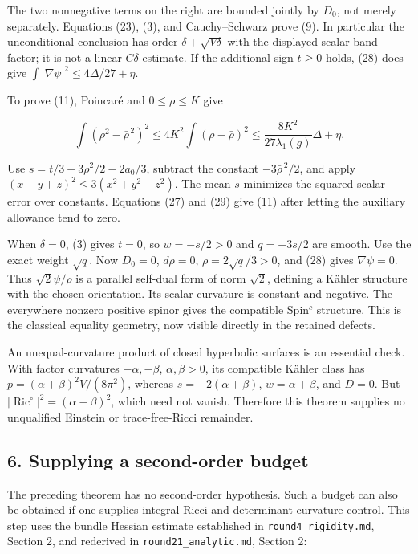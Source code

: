 \documentclass[
  11pt,
]{article}
\begin{document}
The two nonnegative terms on the right are bounded jointly by \(D_0\),
not merely separately. Equations (23), (3), and Cauchy--Schwarz prove
(9). In particular the unconditional conclusion has order
\(\delta+\sqrt{V\delta}\) with the displayed scalar-band factor; it is
not a linear \(C\delta\) estimate. If the additional sign \(t\ge0\)
holds, (28) does give \(\int|\nabla\psi|^2\le4\Delta/27+\eta\).

To prove (11), Poincaré and \(0\le\rho\le K\) give

\[
 \int(\rho^2-\bar\rho^{\,2})^2
 \le4K^2\int(\rho-\bar\rho)^2
 \le\frac{8K^2}{27\lambda_1(g)}\Delta+\eta.
 \tag{29}
\]

Use \(s=t/3-3\rho^2/2-2a_0/3\), subtract the constant
\(-3\bar\rho^{\,2}/2\), and apply \((x+y+z)^2\le3(x^2+y^2+z^2)\). The
mean \(\bar s\) minimizes the squared scalar error over constants.
Equations (27) and (29) give (11) after letting the auxiliary allowance
tend to zero.

When \(\delta=0\), (3) gives \(t=0\), so \(w=-s/2>0\) and \(q=-3s/2\)
are smooth. Use the exact weight \(\sqrt q\). Now \(D_0=0\),
\(d\rho=0\), \(\rho=2\sqrt q/3>0\), and (28) gives \(\nabla\psi=0\).
Thus \(\sqrt2\psi/\rho\) is a parallel self-dual form of norm
\(\sqrt2\), defining a Kähler structure with the chosen orientation. Its
scalar curvature is constant and negative. The everywhere nonzero
positive spinor gives the compatible Spin\(^c\) structure. This is the
classical equality geometry, now visible directly in the retained
defects.

An unequal-curvature product of closed hyperbolic surfaces is an
essential check. With factor curvatures \(-\alpha,-\beta\),
\(\alpha,\beta>0\), its compatible Kähler class has
\(p=(\alpha+\beta)^2V/(8\pi^2)\), whereas \(s=-2(\alpha+\beta)\),
\(w=\alpha+\beta\), and \(D=0\). But
\(|\operatorname{Ric}^{\circ}|^2=(\alpha-\beta)^2\), which need not
vanish. Therefore this theorem supplies no unqualified Einstein or
trace-free-Ricci remainder.

\hypertarget{supplying-a-second-order-budget}{%
\subsection{6. Supplying a second-order
budget}\label{supplying-a-second-order-budget}}

The preceding theorem has no second-order hypothesis. Such a budget can
also be obtained if one supplies integral Ricci and
determinant-curvature control. This step uses the bundle Hessian
estimate established in \texttt{round4\_rigidity.md}, Section 2, and
rederived in \texttt{round21\_analytic.md}, Section 2:
\end{document}
